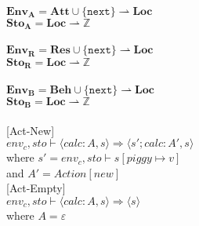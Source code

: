 	$\mathbf{Env_A} = \textbf{Att} \cup \{ \texttt{next} \} \rightharpoonup \mathbf{Loc}$\\
	$\mathbf{Sto_A} = \textbf{Loc} \rightharpoonup \mathbb{Z}$\\
	\\
	$\mathbf{Env_R} = \textbf{Res} \cup \{ \texttt{next} \} \rightharpoonup \mathbf{Loc}$\\
	$\mathbf{Sto_R} = \textbf{Loc} \rightharpoonup \mathbb{Z}$\\
	\\
	$\mathbf{Env_B} = \textbf{Beh} \cup \{ \texttt{next} \} \rightharpoonup \mathbf{Loc}$\\
	$\mathbf{Sto_B} = \textbf{Loc} \rightharpoonup \mathbb{Z}$\\
	\\
	


[Act-New]\\
	$env_c, sto \vdash \langle calc:A, s \rangle \Rightarrow \langle s'; calc:A', s \rangle$\\
	where $s' = env_c, sto \vdash s[piggy \mapsto v]$\\
	and $A' = Action[new]$\\
	
[Act-Empty]\\
	$env_c, sto \vdash \langle calc:A, s \rangle \Rightarrow \langle s \rangle$\\
	where $A = \varepsilon$
	
\pagebreak

